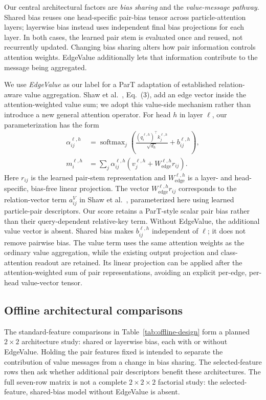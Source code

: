Our central architectural factors are \emph{bias sharing} and the
\emph{value-message pathway}. Shared bias reuses one head-specific pair-bias
tensor across particle-attention layers; layerwise bias instead uses
independent final bias projections for each layer. In both cases, the
learned pair stem is evaluated once and reused, not recurrently updated.
Changing bias sharing alters how pair information controls attention
weights. EdgeValue additionally lets that information contribute to the
message being aggregated.

We use \emph{EdgeValue} as our label for a ParT adaptation of established
relation-aware value aggregation. Shaw et al.~\cite{Shaw2018Relative}, Eq.~(3), add an edge
vector inside the attention-weighted value sum; we adopt this value-side
mechanism rather than introduce a new general attention operator.
For head $h$ in layer $\ell$, our parameterization has the form
\begin{align}
\alpha_{ij}^{\ell,h}
&= \operatorname{softmax}_{j}\left(
\frac{(q_i^{\ell,h})^\top k_j^{\ell,h}}{\sqrt{d_h}}
+ b_{ij}^{\ell,h}\right), \\
m_i^{\ell,h}
&= \sum_j \alpha_{ij}^{\ell,h}
\left(v_j^{\ell,h}+W_{\mathrm{edge}}^{\ell,h}r_{ij}\right).
\label{eq:experimental-edgevalue}
\end{align}
Here $r_{ij}$ is the learned pair-stem representation and
$W_{\mathrm{edge}}^{\ell,h}$ is a layer- and head-specific, bias-free linear
projection. The vector $W_{\mathrm{edge}}^{\ell,h}r_{ij}$ corresponds to
the relation-vector term $a_{ij}^{V}$ in
Shaw et al.~\cite{Shaw2018Relative}, parameterized here using learned
particle-pair descriptors. Our score retains a ParT-style scalar pair bias
rather than their query-dependent relative-key term. Without EdgeValue,
the additional value vector is absent. Shared
bias makes $b_{ij}^{\ell,h}$ independent of $\ell$; it does not remove
pairwise bias. The value term uses the same attention weights as the
ordinary value aggregation, while the existing output projection and
class-attention readout are retained. Its linear projection can be applied
after the attention-weighted sum of pair representations, avoiding an
explicit per-edge, per-head value-vector tensor.

\subsection{Offline architectural comparisons}
\label{sec:offline-design}

The standard-feature comparisons in Table~\ref{tab:offline-design} form
a planned $2\times2$ architecture study: shared or layerwise bias, each
with or without EdgeValue. Holding the pair features fixed is intended to
separate the contribution of value messages from a change in bias sharing.
The selected-feature rows then ask whether additional pair descriptors
benefit these architectures. The full seven-row matrix is not a complete
$2\times2\times2$ factorial study: the selected-feature, shared-bias model
without EdgeValue is absent.

